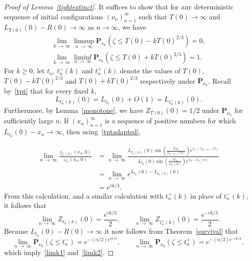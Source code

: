 \documentclass[10pt]{amsart}
\theoremstyle{definition}\newtheorem{defi}[theo]{Definition}\newtheorem{rema}[theo]{Remark}\newtheorem{exam}[theo]{Example}\newtheorem{exem}[theo]{Example}\newtheorem{nota}[theo]{Notation}
\renewcommand*\P{\mathbf{P}}
\newcommand{\1} {\mathds{1}}
\begin{document}
\begin{proof}[Proof of Lemma~\ref{tightextinct}]
It suffices to show that for any deterministic sequence of initial configurations $(\nu_n)_{n=1}^{\infty}$ such that $T(0) \rightarrow \infty$ and $L_{T(0)}(0) - R(0) \rightarrow \infty$ as $n \rightarrow \infty$, we have
\begin{align}
\lim_{k\, \rightarrow\,\infty} \limsup_{n\,\rightarrow\, \infty} \P_{\nu_n}(\zeta \leq T(0) - kT(0)^{2/3}) = 0, \label{limk1}
\\
\lim_{k\,\rightarrow\,\infty} \liminf_{n\,\rightarrow\, \infty} \P_{\nu_n}\left(\zeta \leq T(0) + k T(0)^{2/3}\right) = 1. \label{limk2}
\end{align}
For $k \geq 0$, let $t_n$, $t_n^-(k)$ and $t_n^+(k)$ denote the values of $T(0)$, $T(0) - kT(0)^{2/3}$ and $T(0) + kT(0)^{2/3}$ respectively under $\P_{\nu_n}$. Recall by~\eqref{tpt} that for every fixed $k$,
\begin{equation}\label{tptadapted}
L_{t_n^-(k)}(0) = L_{t_n}(0) + O(1) = L_{t_n^+(k)}(0).
\end{equation}
Furthermore, by Lemma~\ref{monotone}, we have $Z_{T(0)}(0) = 1/2$ under $\P_{\nu_n}$ for sufficiently large $n$. If $(x_n)_{n=1}^{\infty}$ is a sequence of positive numbers for which $L_{t_n}(0) - x_n \rightarrow \infty$, then using~\eqref{tptadapted},

\begin{align*}
\lim_{n\,\rightarrow\,\infty} \frac{z_{t_n^-(k)}(x_n, 0)}{z_{t_n}(x_n, 0)} &= \lim_{n\,\rightarrow\,\infty} \frac{L_{t_n^-(k)}(0) \sin\left(\frac{\pi x_n}{L_{t_n^-(k)}(0)}\right) e^{x_n - L_{t_n^-(k)}(0)}}{L_{t_n}(0) \sin\left(\frac{\pi x_n}{L_{t_n}(0)}\right) e^{x_n - L_{t_n}(0)}} \\
&= \lim_{n\,\rightarrow\,\infty} e^{L_{t_n}(0) - L_{t_n^-(k)}(0)} \\
&= e^{ck/3}.
\end{align*}
From this calculation, and a similar calculation with $t_n^+(k)$ in place of $t_n^-(k)$, it follows that
\begin{equation}\label{zchange}
\lim_{n\,\rightarrow\,\infty} Z_{t_n^-(k)}(0) = \frac{e^{ck/3}}{2}, \qquad\lim_{n\,\rightarrow\,\infty} Z_{t_n^+(k)}(0) = \frac{e^{-ck/3}}{2}.
\end{equation}
Because $L_{t_n}(0) - R(0) \rightarrow \infty$ it now follows from Theorem~\ref{survival} that
\[
\lim_{n\,\rightarrow\,\infty} \P_{\nu_n}\left(\zeta \leq t_n^-\right) = e^{-(\alpha/2) e^{ck/3}}, \qquad \lim_{n \,\rightarrow\,\infty} \P_{\nu_n}\left(\zeta \leq t_n^+\right) = e^{-(\alpha/2) e^{-ck/3}},
\]
which imply~\eqref{limk1} and~\eqref{limk2}.
\end{proof}
\end{document}
